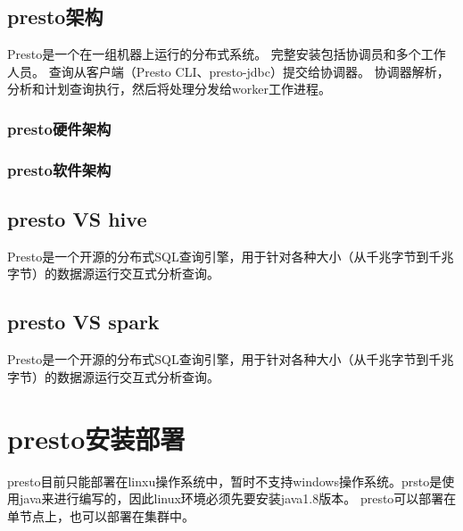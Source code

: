 \documentclass[letterpaper,10pt,english]{sphinxmanual}
\begin{document}
\section{presto架构}
\label{\detokenize{overview/architecture:presto}}\label{\detokenize{overview/architecture::doc}}
Presto是一个在一组机器上运行的分布式系统。 完整安装包括协调员和多个工作人员。 查询从客户端（Presto CLI、presto-jdbc）提交给协调器。 协调器解析，
分析和计划查询执行，然后将处理分发给worker工作进程。


\subsection{presto硬件架构}
\label{\detokenize{overview/architecture:id1}}
\noindent{}


\subsection{presto软件架构}
\label{\detokenize{overview/architecture:id2}}
\noindent{}


\section{presto VS hive}
\label{\detokenize{overview/prestovshive:presto-vs-hive}}\label{\detokenize{overview/prestovshive::doc}}
\begin{sphinxVerbatim}[commandchars=\\\{\}]
Presto是一个开源的分布式SQL查询引擎，用于针对各种大小（从千兆字节到千兆字节）的数据源运行交互式分析查询。
\end{sphinxVerbatim}


\section{presto VS spark}
\label{\detokenize{overview/prestovsspark:presto-vs-spark}}\label{\detokenize{overview/prestovsspark::doc}}
\begin{sphinxVerbatim}[commandchars=\\\{\}]
Presto是一个开源的分布式SQL查询引擎，用于针对各种大小（从千兆字节到千兆字节）的数据源运行交互式分析查询。
\end{sphinxVerbatim}


\chapter{presto安装部署}
\label{\detokenize{installation:presto}}\label{\detokenize{installation::doc}}
presto目前只能部署在linxu操作系统中，暂时不支持windows操作系统。prsto是使用java来进行编写的，因此linux环境必须先要安装java1.8版本。
presto可以部署在单节点上，也可以部署在集群中。
\end{document}
